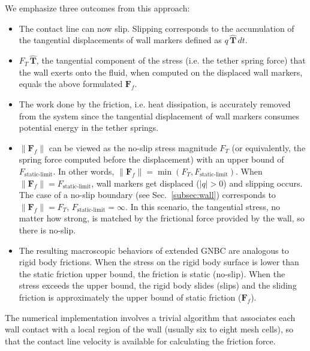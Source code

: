 \documentclass[%
 aip,
 amsmath,amssymb,
 reprint,
 floatfix
]{revtex4-1}
\begin{document}
We emphasize three outcomes from this approach: 
\begin{itemize}
    \item The contact line can now slip. Slipping corresponds to the accumulation of the tangential displacements of wall markers defined as $q \, \bm{\hat{T}} \,dt$. 
    \item $F_T \, \bm{\hat{T}}$, the tangential component of the stress (i.e. the tether spring force) that the wall exerts onto the fluid, when computed on the displaced wall markers, equals the above formulated $\bm{F}_f$. 
    \item The work done by the friction, i.e. heat dissipation, is accurately removed from the system since the tangential displacement of wall markers consumes potential energy in the tether springs. 
    \item $\lVert \bm{F}_f \rVert$ can be viewed as the no-slip stress magnitude $F_T$ (or equivalently, the spring force computed before the displacement) with an upper bound of $F_\text{static-limit}$. In other words, $\lVert \bm{F}_f \rVert = \min ( F_T, F_\text{static-limit} )$. When $\lVert \bm{F}_f \rVert = F_\text{static-limit}$, wall markers get displaced ($|q| > 0$) and slipping occurs. The case of a no-slip boundary (see Sec.~\ref{subsec:wall}) corresponds to $\lVert \bm{F}_f \rVert = F_T$,  $F_\text{static-limit} = \infty$. In this scenario, the tangential stress, no matter how strong, is matched by the frictional force provided by the wall, so there is no-slip. 
    \item The resulting macroscopic behaviors of extended GNBC are analogous to rigid body frictions. When the stress on the rigid body surface is lower than the static friction upper bound, the friction is static (no-slip). When the stress exceeds the upper bound, the rigid body slides (slips) and the sliding friction is approximately the upper bound of static friction ($\bm{F}_f$). 
\end{itemize}
The numerical implementation involves a trivial algorithm that associates each wall contact with a local region of the wall (usually six to eight mesh cells), so that the contact line velocity is available for calculating the friction force. 
\end{document}
